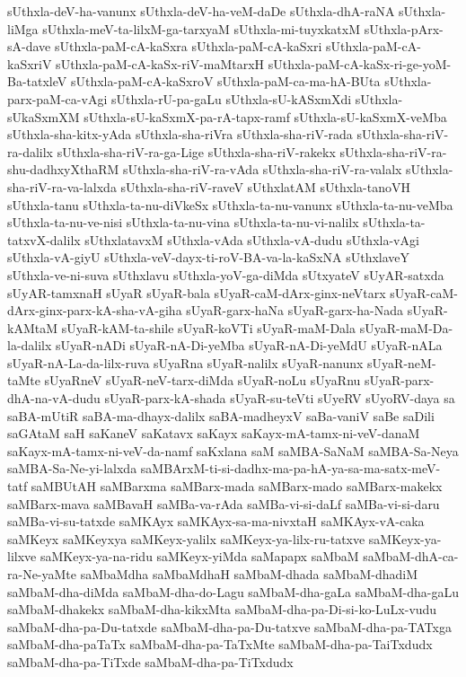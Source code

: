 {sUthxla-deV-ha-vanunx
sUthxla-deV-ha-veM-daDe
sUthxla-dhA-raNA
sUthxla-liMga
sUthxla-meV-ta-lilxM-ga-tarxyaM
sUthxla-mi-tuyxkatxM
sUthxla-pArx-sA-dave
sUthxla-paM-cA-kaSxra
sUthxla-paM-cA-kaSxri
sUthxla-paM-cA-kaSxriV
sUthxla-paM-cA-kaSx-riV-maMtarxH
sUthxla-paM-cA-kaSx-ri-ge-yoM-Ba-tatxleV
sUthxla-paM-cA-kaSxroV
sUthxla-paM-ca-ma-hA-BUta
sUthxla-parx-paM-ca-vAgi
sUthxla-rU-pa-gaLu
sUthxla-sU-kASxmXdi
sUthxla-sUkaSxmXM
sUthxla-sU-kaSxmX-pa-rA-tapx-ramf
sUthxla-sU-kaSxmX-veMba
sUthxla-sha-kitx-yAda
sUthxla-sha-riVra
sUthxla-sha-riV-rada
sUthxla-sha-riV-ra-dalilx
sUthxla-sha-riV-ra-ga-Lige
sUthxla-sha-riV-rakekx
sUthxla-sha-riV-ra-shu-dadhxyXthaRM
sUthxla-sha-riV-ra-vAda
sUthxla-sha-riV-ra-valalx
sUthxla-sha-riV-ra-va-lalxda
sUthxla-sha-riV-raveV
sUthxlatAM
sUthxla-tanoVH
sUthxla-tanu
sUthxla-ta-nu-diVkeSx
sUthxla-ta-nu-vanunx
sUthxla-ta-nu-veMba
sUthxla-ta-nu-ve-nisi
sUthxla-ta-nu-vina
sUthxla-ta-nu-vi-nalilx
sUthxla-ta-tatxvX-dalilx
sUthxlatavxM
sUthxla-vAda
sUthxla-vA-dudu
sUthxla-vAgi
sUthxla-vA-giyU
sUthxla-veV-dayx-ti-roV-BA-va-la-kaSxNA
sUthxlaveY
sUthxla-ve-ni-suva
sUthxlavu
sUthxla-yoV-ga-diMda
sUtxyateV
sUyAR-satxda
sUyAR-tamxnaH
sUyaR
sUyaR-bala
sUyaR-caM-dArx-ginx-neVtarx
sUyaR-caM-dArx-ginx-parx-kA-sha-vA-giha
sUyaR-garx-haNa
sUyaR-garx-ha-Nada
sUyaR-kAMtaM
sUyaR-kAM-ta-shile
sUyaR-koVTi
sUyaR-maM-Dala
sUyaR-maM-Da-la-dalilx
sUyaR-nADi
sUyaR-nA-Di-yeMba
sUyaR-nA-Di-yeMdU
sUyaR-nALa
sUyaR-nA-La-da-lilx-ruva
sUyaRna
sUyaR-nalilx
sUyaR-nanunx
sUyaR-neM-taMte
sUyaRneV
sUyaR-neV-tarx-diMda
sUyaR-noLu
sUyaRnu
sUyaR-parx-dhA-na-vA-dudu
sUyaR-parx-kA-shada
sUyaR-su-teVti
sUyeRV
sUyoRV-daya
sa
saBA-mUtiR
saBA-ma-dhayx-dalilx
saBA-madheyxV
saBa-vaniV
saBe
saDili
saGAtaM
saH
saKaneV
saKatavx
saKayx
saKayx-mA-tamx-ni-veV-danaM
saKayx-mA-tamx-ni-veV-da-namf
saKxlana
saM
saMBA-SaNaM
saMBA-Sa-Neya
saMBA-Sa-Ne-yi-lalxda
saMBArxM-ti-si-dadhx-ma-pa-hA-ya-sa-ma-satx-meV-tatf
saMBUtAH
saMBarxma
saMBarx-mada
saMBarx-mado
saMBarx-makekx
saMBarx-mava
saMBavaH
saMBa-va-rAda
saMBa-vi-si-daLf
saMBa-vi-si-daru
saMBa-vi-su-tatxde
saMKAyx
saMKAyx-sa-ma-nivxtaH
saMKAyx-vA-caka
saMKeyx
saMKeyxya
saMKeyx-yalilx
saMKeyx-ya-lilx-ru-tatxve
saMKeyx-ya-lilxve
saMKeyx-ya-na-ridu
saMKeyx-yiMda
saMapapx
saMbaM
saMbaM-dhA-ca-ra-Ne-yaMte
saMbaMdha
saMbaMdhaH
saMbaM-dhada
saMbaM-dhadiM
saMbaM-dha-diMda
saMbaM-dha-do-Lagu
saMbaM-dha-gaLa
saMbaM-dha-gaLu
saMbaM-dhakekx
saMbaM-dha-kikxMta
saMbaM-dha-pa-Di-si-ko-LuLx-vudu
saMbaM-dha-pa-Du-tatxde
saMbaM-dha-pa-Du-tatxve
saMbaM-dha-pa-TATxga
saMbaM-dha-paTaTx
saMbaM-dha-pa-TaTxMte
saMbaM-dha-pa-TaiTxdudx
saMbaM-dha-pa-TiTxde
saMbaM-dha-pa-TiTxdudx
}
